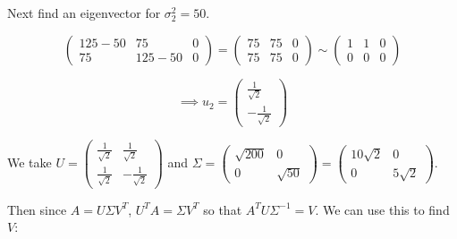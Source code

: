 \documentclass[11pt]{article}
\begin{document}
Next find an eigenvector for $\sigma_2^2 = 50$.

$$\begin{pmatrix}
125-50 & 75 & 0\\ 75 & 125-50 & 0
\end{pmatrix} = \begin{pmatrix}
75 & 75 & 0\\ 75 & 75 & 0
\end{pmatrix} \sim  \begin{pmatrix}
1& 1&0 \\ 0&0&0
\end{pmatrix}$$

$$\implies u_2 = \begin{pmatrix}
\frac{1}{\sqrt{2}} \\ -\frac{1}{\sqrt{2}}
\end{pmatrix}$$
 
We take $U = \begin{pmatrix}
\frac{1}{\sqrt{2}} & \frac{1}{\sqrt{2}} \\ \frac{1}{\sqrt{2}} & -\frac{1}{\sqrt{2}}
\end{pmatrix}$ and $\Sigma = \begin{pmatrix}
\sqrt{200} & 0 \\ 0 & \sqrt{50}
\end{pmatrix} = \begin{pmatrix}
10\sqrt{2} & 0 \\ 0 & 5\sqrt{2}
\end{pmatrix}$. 

Then since $A = U\Sigma V^T$, $U^TA = \Sigma V^T$ so that $A^TU\Sigma^{-1} = V$. We can use this to find $V$:
\end{document}
